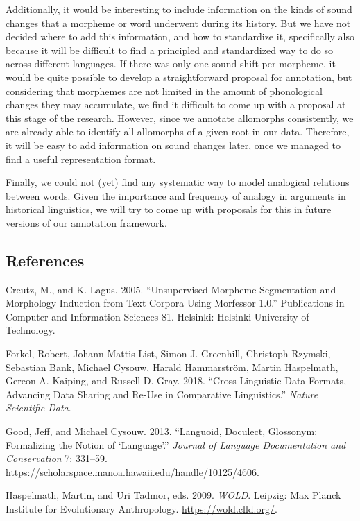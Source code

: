 \documentclass[
  a4paper,
  14pt,
  oneside,
  tablecaptionabove
]{scrbook}
\begin{document}
Additionally, it would be interesting to include information on the
kinds of sound changes that a morpheme or word underwent during its
history. But we have not decided where to add this information, and how
to standardize it, specifically also because it will be difficult to
find a principled and standardized way to do so across different
languages. If there was only one sound shift per morpheme, it would be
quite possible to develop a straightforward proposal for annotation, but
considering that morphemes are not limited in the amount of phonological
changes they may accumulate, we find it difficult to come up with a
proposal at this stage of the research. However, since we annotate
allomorphs consistently, we are already able to identify all allomorphs
of a given root in our data. Therefore, it will be easy to add
information on sound changes later, once we managed to find a useful
representation format.

Finally, we could not (yet) find any systematic way to model analogical
relations between words. Given the importance and frequency of analogy
in arguments in historical linguistics, we will try to come up with
proposals for this in future versions of our annotation framework.

\subsection*{References}

\nopagebreak\hangindent=0.7cm {\small Creutz, M., and K. Lagus. 2005. \enquote{Unsupervised Morpheme
Segmentation and Morphology Induction from Text Corpora Using Morfessor
1.0.} Publications in Computer and Information Sciences 81. Helsinki:
Helsinki University of Technology. }


\nopagebreak\hangindent=0.7cm {\small Forkel, Robert, Johann-Mattis List, Simon J. Greenhill, Christoph
Rzymski, Sebastian Bank, Michael Cysouw, Harald Hammarström, Martin
Haspelmath, Gereon A. Kaiping, and Russell D. Gray. 2018.
\enquote{Cross-Linguistic Data Formats, Advancing Data Sharing and
Re-Use in Comparative Linguistics.} \emph{Nature Scientific Data}. }


\nopagebreak\hangindent=0.7cm {\small Good, Jeff, and Michael Cysouw. 2013. \enquote{Languoid, Doculect,
Glossonym: Formalizing the Notion of \enquote{Language}.} \emph{Journal
of Language Documentation and Conservation} 7: 331--59.
\url{https://scholarspace.manoa.hawaii.edu/handle/10125/4606}. }

\nopagebreak\hangindent=0.7cm {\small Haspelmath, Martin, and Uri Tadmor, eds. 2009. \emph{WOLD}.  Leipzig:
Max Planck Institute for Evolutionary Anthropology.
\url{https://wold.clld.org/}. }
\end{document}
